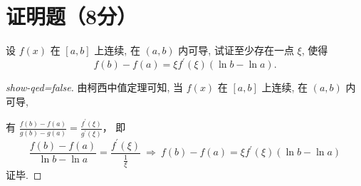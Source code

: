 \documentclass{USTBExam}
\begin{document}
\section{证明题（8分）}

\begin{problem}
  设 $f(x)$ 在 $[a, b]$ 上连续, 在 $(a, b)$ 内可导, 试证至少存在一点 $\xi$, 使得
  $$f(b)-f(a)=\xi f^{\prime}(\xi)(\ln b-\ln a).$$
\end{problem}

\begin{proof}[show-qed=false]
  由柯西中值定理可知, 当 $f(x)$ 在 $[a, b]$ 上连续, 在 $(a, b)$ 内可导,

  有
  $\frac{f(b)-f(a)}{g(b)-g(a)}=\frac{f^{\prime}(\xi)}{g^{\prime}(\xi)}$，
  即
  $$\frac{f(b)-f(a)}{\ln b-\ln a}=\frac{f^{\prime}(\xi)}{\frac{1}{\xi}}
    ~\Rightarrow~
    f(b)-f(a)=\xi f^{\prime}(\xi)(\ln b-\ln a) $$
  证毕.
\end{proof}
\end{document}
